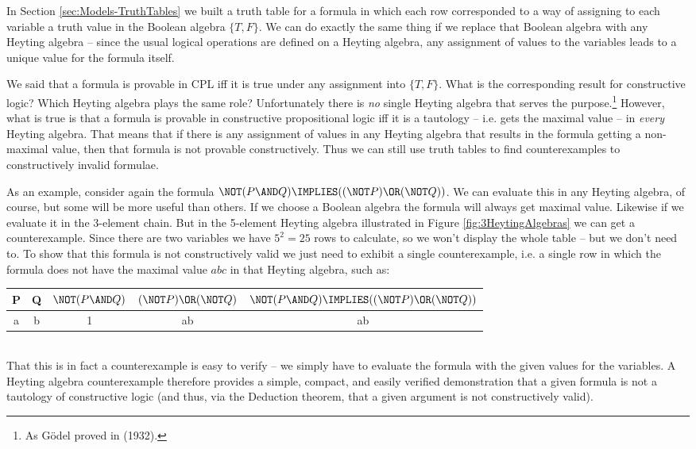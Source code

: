 In Section \ref{sec:Models-TruthTables} we built a truth table for a formula in which each row corresponded to a way of assigning to each variable a truth value in the Boolean algebra $\{T, F\}$.  We can do exactly the same thing if we replace that Boolean algebra with any Heyting algebra -- since the usual logical operations are defined on a Heyting algebra, any assignment of values to the variables leads to a unique value for the formula itself.

We said that a formula is provable in CPL iff it is true under any assignment into $\{T, F\}$.  What is the corresponding result for constructive logic?  Which Heyting algebra plays the same role?  Unfortunately there is \emph{no} single Heyting algebra that serves the purpose.\footnote{As G\"{o}del proved in (1932).}  
However, what is true is that a formula is provable in constructive propositional logic iff it is a tautology -- i.e. gets the maximal value -- in \emph{every} Heyting algebra.  That means that if there is any assignment of values in any Heyting algebra that results in the formula getting a non-maximal value, then that formula is not provable constructively.  Thus we can still use truth tables to find  counterexamples to constructively invalid formulae.

As an example, consider again the formula 
$\NOT (P \AND Q) \IMPLIES ((\NOT P) \OR (\NOT Q))$.  We can evaluate this in any Heyting algebra, of course, but some will be more useful than others.  If we choose a Boolean algebra the formula will always get maximal value.  Likewise if we evaluate it in the 3-element chain.  But  in the 5-element Heyting algebra illustrated in Figure \ref{fig:3HeytingAlgebras} we can get a counterexample.  Since there are two variables we have $5^2=25$ rows to calculate, so we won't display the whole table -- but we don't need to.  To show that this formula is not constructively valid we just need to exhibit a single counterexample, i.e. a single row in which the formula does not have the maximal value $abc$ in that Heyting algebra, such as:
\begin{table}[h]
\centering
\begin{tabular}{c c|c c c}
P &	Q & $\NOT(P \AND Q)$ &	$(\NOT P) \OR (\NOT Q)$ &	$\NOT (P \AND Q) \IMPLIES ((\NOT P) \OR (\NOT Q))$ \\
\hline
a & b & 1 & ab & ab
\end{tabular}
\end{table}\\
That this is in fact a counterexample is easy to verify -- we simply have to evaluate the formula with the given values for the variables.  A Heyting algebra counterexample therefore provides a simple, compact, and easily verified demonstration that a given formula is not a tautology of constructive logic (and thus, via the Deduction theorem, that a given argument is not constructively valid).



